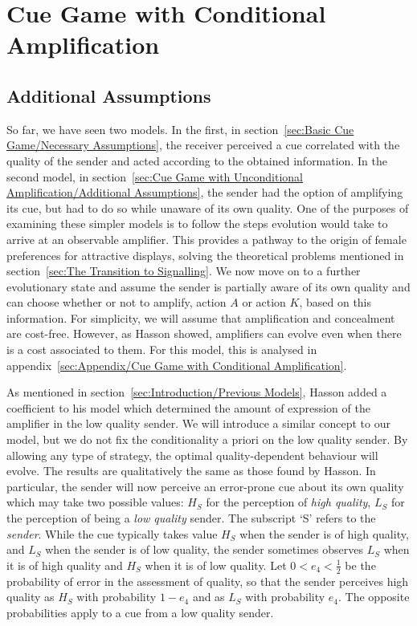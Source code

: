 \documentclass[a4paper,12pt]{article}
\numberwithin{equation}{section}
\begin{document}
\newpage\clearpage


\section{Cue Game with Conditional Amplification}
\label{sec:Cue Game with Conditional Amplification}
\subsection{Additional Assumptions}
\label{sec:Cue Game with Conditional Amplification/Additional Assumptions}

So far, we have seen two models. In the first, in section~\ref{sec:Basic Cue Game/Necessary Assumptions}, the receiver perceived a cue correlated with the quality of the sender and acted according to the obtained information. In the second model, in section~\ref{sec:Cue Game with Unconditional Amplification/Additional Assumptions}, the sender had the option of amplifying its cue, but had to do so while unaware of its own quality. One of the purposes of examining these simpler models is to follow the steps evolution would take to arrive at an observable amplifier. This provides a pathway to the origin of female preferences for attractive displays, solving the theoretical problems mentioned in section~\ref{sec:The Transition to Signalling}. We now move on to a further evolutionary state and assume the sender is partially aware of its own quality and can choose whether or not to amplify, action $A$ or action $K$, based on this information. For simplicity, we will assume that amplification and concealment are cost-free. However, as Hasson showed, amplifiers can evolve even when there is a cost associated to them. For this model, this is analysed in appendix~\ref{sec:Appendix/Cue Game with Conditional Amplification}.

As mentioned in section~\ref{sec:Introduction/Previous Models}, Hasson added a coefficient to his model which determined the amount of expression of the amplifier in the low quality sender. We will introduce a similar concept to our model, but we do not fix the conditionality a priori on the low quality sender. By allowing any type of strategy, the optimal quality-dependent behaviour will evolve. The results are qualitatively the same as those found by Hasson. In particular, the sender will now perceive an error-prone cue about its own quality which may take two possible values: $H_{S}$ for the perception of \textit{high quality}, $L_{S}$ for the perception of being a \textit{low quality} sender. The subscript `S' refers to the \textit{sender}. While the cue typically takes value $H_{S}$ when the sender is of high quality, and $L_{S}$ when the sender is of low quality, the sender sometimes observes $L_{S}$ when it is of high quality and $H_{S}$ when it is of low quality. Let $0<e_{4}<\frac{1}{2}$ be the probability of error in the assessment of quality, so that the sender perceives high quality as $H_{S}$ with probability $1-e_{4}$ and as $L_{S}$ with probability $e_{4}$. The opposite probabilities apply to a cue from a low quality sender.
\end{document}
